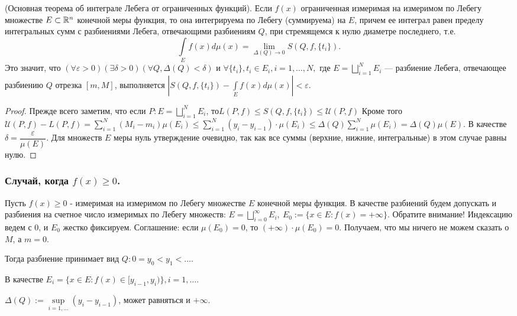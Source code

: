 \begin{theorem}(Основная теорема об интеграле Лебега от ограниченных функций).
	Если $f(x)$ ограниченная измеримая на измеримом по Лебегу множестве $ E\subset\mathbb{R}^n $ конечной меры  функция, то она интегрируема по Лебегу (суммируема) на $E$, причем ее интеграл равен пределу интегральных сумм с разбиениями Лебега, отвечающими разбиениям  $ Q $, при стремящемся к нулю диаметре последнего, т.е. $$\int\limits_E f(x)d\mu(x)=\lim_{\Delta(Q)\to 0}S(Q,f,\{t_i\}).$$
	Это значит, что $(\forall \varepsilon >0)(\exists \delta > 0)(\forall Q, \Delta(Q)<\delta) \text{ и } \forall \{t_i\}, t_i \in E_i, i=1,\ldots, N,$ где $E=\bigsqcup\limits_{i=1}^N E_i$ --- разбиение Лебега, отвечающее разбиению $Q$ отрезка $[m, M]$, выполняется $|S(Q, f, \{t_i\})-\int\limits_E f(x)d\mu(x)|<\varepsilon$.
\end{theorem}

\begin{proof}
	Прежде всего заметим, что если $P: E=\bigsqcup\limits_{i=1}^N E_i$, то\newline $L(P, f)\leqslant S(Q, f, \{t_i\})\leqslant \mathcal{U}(P, f)$ Кроме того $\mathcal{U}(P, f) - L(P, f) = \sum\limits_{i=1}^N(M_i-m_i)\mu(E_i) \leqslant \sum\limits_{i=1}^N (y_i-y_{i-1})\cdot\mu(E_i)\leqslant \Delta(Q) \sum\limits_{i=1}^N\mu(E_i)=\Delta(Q)\mu(E)$. В качестве $\delta = \dfrac{\varepsilon}{\mu(E)}$. Для множеств $ E $ меры нуль утверждение очевидно, так как все суммы (верхние, нижние, интегральные) в этом случае равны нулю.
\end{proof}
\subsubsection{Случай, когда $f(x)\geqslant 0$.}
Пусть $f(x)\geqslant 0$ - измеримая на измеримом по Лебегу множестве $E$ конечной меры функция. В качестве разбиений будем допускать и разбиения на счетное число измеримых по Лебегу множеств: $E = \bigsqcup\limits_{i=0 }^{\infty}E_i,\ E_0:=\{x\in E:f(x)=+\infty\}$. Обратите внимание! Индексацию ведем с 0, и $E_0$ жестко фиксируем. Соглашение: если $\mu(E_0)=0$, то $(+\infty)\cdot \mu(E_0)=0$. Получаем, что мы ничего не можем сказать о $M$, а $m=0$. 

Тогда разбиение принимает вид $Q: 0=y_0<y_1<\ldots$. 

В качестве $E_i = \{x\in E: f(x)\in[y_{i-1}, y_i)\}, i=1,\ldots$.

$\Delta(Q):=\sup\limits_{i=1, \ldots}(y_i-y_{i-1})$, может равняться и $+\infty$.

